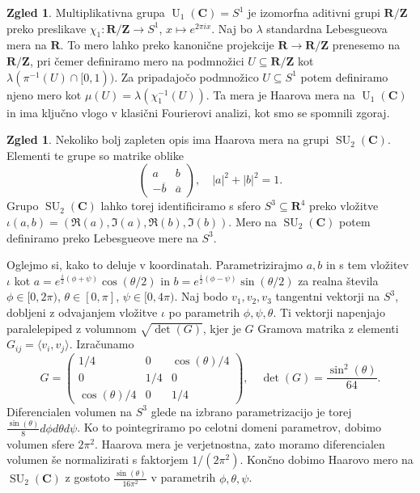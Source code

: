 \documentclass[11pt]{book}
\def\ZZ{\mathbf{Z}}
\def\RR{\mathbf{R}}
\def\CC{\mathbf{C}}
\DeclareMathOperator\SU{SU}
\DeclareMathOperator\U{U}
\theoremstyle{definition}
\theoremstyle{zgled}
\newtheorem{zgled}[theorem]{Zgled}
\theoremstyle{zgledbrezstevilke}
\theoremstyle{odprtproblem}
\theoremstyle{domacanaloga}
\theoremstyle{izrek}
\begin{document}
\begin{zgled}
Multiplikativna grupa $\U_1(\CC) = S^1$ je izomorfna aditivni grupi $\RR/\ZZ$ preko preslikave $\chi_1 \colon \RR/\ZZ \to S^1$, $x \mapsto e^{2 \pi i x}$. Naj bo $\lambda$ standardna Lebesgueova mera na $\RR$. To mero lahko preko kanonične projekcije $\RR \to \RR/\ZZ$ prenesemo na $\RR/\ZZ$, pri čemer definiramo mero na podmnožici $U \subseteq \RR/\ZZ$ kot $\lambda(\pi^{-1}(U) \cap [0,1))$. Za pripadajočo podmnožico $U \subseteq S^1$ potem definiramo njeno mero kot $\mu(U) = \lambda(\chi_1^{-1}(U))$. Ta mera je Haarova mera na $\U_1(\CC)$ in ima ključno vlogo v klasični Fourierovi analizi, kot smo se spomnili zgoraj.
\end{zgled}

\begin{zgled}
Nekoliko bolj zapleten opis ima Haarova mera na grupi $\SU_2(\CC)$. Elementi te grupe so matrike oblike
\[
    \begin{pmatrix}
        a & b \\
        -\overline{b} & \overline{a}
    \end{pmatrix}, \quad |a|^2 + |b|^2 = 1.
\]
Grupo $\SU_2(\CC)$ lahko torej identificiramo s sfero $S^3 \subseteq \RR^4$ preko vložitve $\iota(a,b) = (\Re(a), \Im(a), \Re(b), \Im(b))$. Mero na $\SU_2(\CC)$ potem definiramo preko Lebesgueove mere na $S^3$. 

Oglejmo si, kako to deluje v koordinatah. Parametrizirajmo $a,b$ in s tem vložitev $\iota$ kot $a = e^{\frac{i}{2} (\phi + \psi)} \cos(\theta/2)$ in $b = e^{\frac{i}{2} (\phi - \psi)} \sin(\theta/2)$ za realna števila $\phi \in [0, 2\pi)$, $\theta \in [0, \pi]$, $\psi \in [0, 4\pi)$. Naj bodo $v_1, v_2, v_3$ tangentni vektorji na $S^3$, dobljeni z odvajanjem vložitve $\iota$ po parametrih $\phi, \psi, \theta$. Ti vektorji napenjajo paralelepiped z volumnom $\sqrt{\det(G)}$, kjer je $G$ Gramova matrika z elementi $G_{ij} = \langle v_i, v_j \rangle$. Izračunamo
\[
G = \begin{pmatrix}
    1/4 & 0 & \cos(\theta)/4 \\
    0 & 1/4 & 0 \\
    \cos(\theta)/4 & 0 & 1/4
\end{pmatrix}, \quad \det(G) = \frac{\sin^2(\theta)}{64}.
\]
Diferencialen volumen na $S^3$ glede na izbrano parametrizacijo je torej $\frac{\sin(\theta)}{8} d\phi d\theta d\psi$. Ko to pointegriramo po celotni domeni parametrov, dobimo volumen sfere $2 \pi^2$. Haarova mera je verjetnostna, zato moramo diferencialen volumen še normalizirati s faktorjem $1/(2 \pi^2)$. Končno dobimo Haarovo mero na $\SU_2(\CC)$ z gostoto $\frac{\sin(\theta)}{16 \pi^2}$ v parametrih $\phi, \theta, \psi$. 
\end{zgled}
\end{document}
